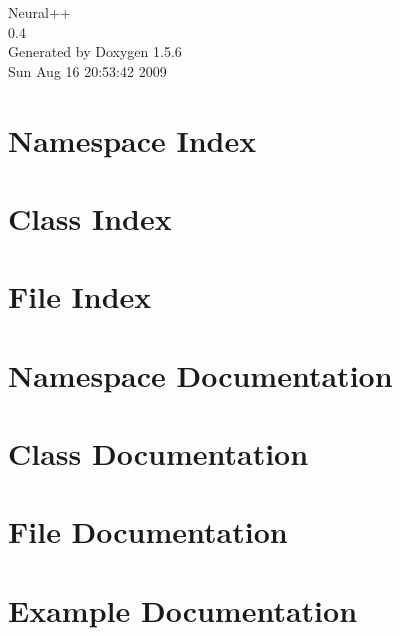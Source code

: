 \documentclass[a4paper]{book}
\begin{document}
\begin{titlepage}
\vspace*{7cm}
\begin{center}
{\Large Neural++ \\[1ex]\large 0.4 }\\
\vspace*{1cm}
{\large Generated by Doxygen 1.5.6}\\
\vspace*{0.5cm}
{\small Sun Aug 16 20:53:42 2009}\\
\end{center}
\end{titlepage}
\clearemptydoublepage
{}
\tableofcontents
\clearemptydoublepage
{}
\chapter{Namespace Index}

\chapter{Class Index}

\chapter{File Index}

\chapter{Namespace Documentation}

\chapter{Class Documentation}
























\chapter{File Documentation}



\chapter{Example Documentation}



\printindex
\end{document}
